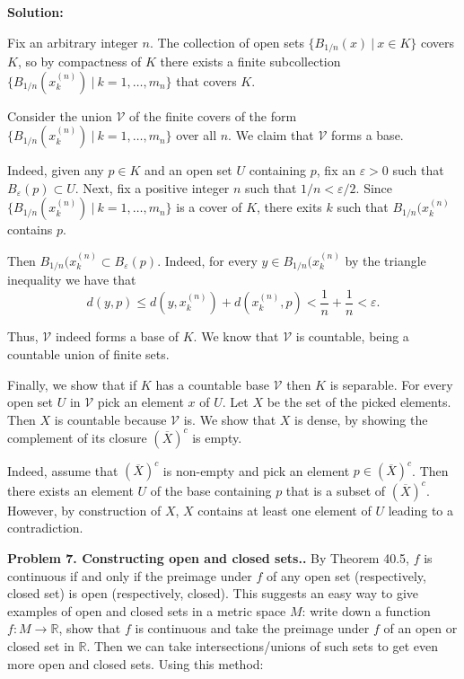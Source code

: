 \documentclass[12pt]{article}
\def\black{\color{black}}
\def\green{\color{rltgreen}}
\renewcommand\|{\ | \ }
\newcommand\ra{\rightarrow}
\newcommand\mc\mathcal
\newcommand\R{\mathbb{R}}
\def\pb#1{{\green \bf Problem #1.}\hskip 8pt \black}
\def\sol{\textbf{Solution:}}
\newcommand\e\varepsilon
\begin{document}
\sol

Fix an arbitrary integer $n$. The collection of open sets
$\{B_{1/n}(x) \| x \in K\}$ covers $K$, so by compactness of $K$ there exists
a finite subcollection $\{B_{1/n}(x_k^{(n)}) \| k = 1, \ldots, m_n\}$ that
covers $K$. 

Consider the union $\mc V$ of the finite covers of the form
$\{B_{1/n}(x_k^{(n)}) \| k = 1, \ldots, m_n\}$ over all $n$.
We claim that $\mc V$ forms a base.

Indeed, given any $p \in K$ and an open set $U$ containing $p$, fix an
$\e > 0$ such that $B_{\e}(p) \subset U$. Next, fix a positive integer $n$
such that $1/n < \e/2$. Since $\{B_{1/n}(x_k^{(n)}) \| k = 1, \ldots, m_n\}$
is a cover of $K$, there exits $k$ such that $B_{1/n}(x_k^{(n)}$ contains $p$.

Then $B_{1/n}(x_k^{(n)} \subset B_{\e}(p)$. Indeed, for every 
$y \in B_{1/n}(x_k^{(n)}$ by the triangle inequality we have that
\[
d(y, p) \leq d(y, x_k^{(n)}) + d(x_k^{(n)}, p) < \frac 1 n + \frac 1 n < \e.
\]

Thus, $\mc V$ indeed forms a base of $K$. We know that $\mc V$ is countable,
being a countable union of finite sets.

Finally, we show that if $K$ has a countable base $\mc V$ then $K$ is 
separable.
For every open set $U$ in $\mc V$ pick an element $x$ of $U$. Let $X$ be the
set of the picked elements. Then $X$ is countable because $\mc V$ is.
We show that $X$ is dense, by showing the complement of its closure
$(\overline X)^c$ is empty.

Indeed, assume that $(\overline X)^c$ is non-empty and pick an element 
$p \in (\overline X)^c$. Then there exists an element $U$ of the base
containing $p$ that is a subset of $(\overline X)^c$. However, by construction
of $X$, $X$ contains at least one element of $U$ leading to a contradiction.


\pb{7. Constructing open and closed sets.}
By Theorem 40.5, $f$ is continuous if and only if the preimage under $f$ of 
any open set (respectively, closed set) is open (respectively, closed).
This suggests an easy way to give examples of open and closed sets in a metric
space $M$: write down a function $f: M \ra \R$, show that $f$ is continuous
and take the preimage under $f$ of an open or closed set in $\R$. Then 
we can take intersections/unions of such sets to get even more open and closed
sets. Using this method:
\end{document}
